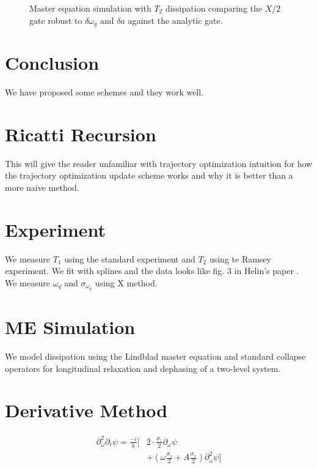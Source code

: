 \documentclass[
  amsfonts,
  amsmath,
  tbtags,
  amssymb,
  aps,
  nobibnotes,
  twocolumn,
]{revtex4-2}
\begin{document}
\begin{figure}
  \caption{Master equation simulation with $T_{2}$ dissipation
    comparing the $X/2$ gate robust to $\delta \omega_{q}$ and $\delta a$ against
    the analytic gate.}
\end{figure}



\section{Conclusion}
We have proposed some schemes and they work well.


\appendix
\section{Ricatti Recursion}
This will give the reader unfamiliar with trajectory
optimization intuition for how the trajectory optimization
update scheme works and why it is better than
a more naive method.


\section{Experiment}
We measure $T_{1}$ using the standard experiment
and $T_{2}$ using te Ramsey experiment. We fit with splines
and the data looks like fig. 3 in Helin's paper \cite{zhang2020universal}.
We measure $\omega_{q}$ and $\sigma_{\omega_{q}}$ using X method.


\section{ME Simulation}
We model dissipation using the Lindblad master
equation and standard collapse operators for
longitudinal relaxation and dephasing
of a two-level system.


\section{Derivative Method}
\begin{equation}
  \begin{aligned}
    \partial_{\omega}^{2} \partial_{t} \psi
    = \frac{-i}{h} [&2 \cdot \frac{\sigma_{z}}{2} \partial_{\omega} \psi\\
      &+ (\omega \frac{\sigma_{z}}{2} + A \frac{\sigma_{x}}{2}) \partial_{\omega}^{2} \psi]
  \end{aligned}
\end{equation}



\end{document}
